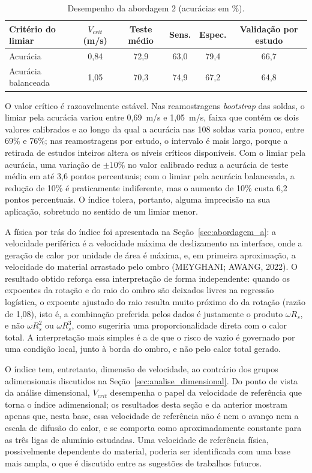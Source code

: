 \documentclass[12pt,openany]{report}
\begin{document}
\begin{table}[htbp]
\centering
\caption{Desempenho da abordagem 2 (acurácias em \%).}
\label{tab:res_abord2}
\small
\begin{tabular}{lccccc}
\toprule
\textbf{Critério do limiar} & \textbf{$V_{crit}$ (m/s)} & \textbf{Teste médio} & \textbf{Sens.} & \textbf{Espec.} & \textbf{Validação por estudo} \\ \midrule
Acurácia & 0,84 & 72,9 & 63,0 & 79,4 & 66,7 \\
Acurácia balanceada & 1,05 & 70,3 & 74,9 & 67,2 & 64,8 \\ \bottomrule
\end{tabular}
\end{table}

O valor crítico é razoavelmente estável. Nas reamostragens \textit{bootstrap} das soldas, o limiar pela acurácia variou entre 0,69~m/s e 1,05~m/s, faixa que contém os dois valores calibrados e ao longo da qual a acurácia nas 108 soldas varia pouco, entre 69\% e 76\%; nas reamostragens por estudo, o intervalo é mais largo, porque a retirada de estudos inteiros altera os níveis críticos disponíveis. Com o limiar pela acurácia, uma variação de $\pm10\%$ no valor calibrado reduz a acurácia de teste média em até 3,6 pontos percentuais; com o limiar pela acurácia balanceada, a redução de 10\% é praticamente indiferente, mas o aumento de 10\% custa 6,2 pontos percentuais. O índice tolera, portanto, alguma imprecisão na sua aplicação, sobretudo no sentido de um limiar menor.

A física por trás do índice foi apresentada na Seção~\ref{sec:abordagem_a}: a velocidade periférica é a velocidade máxima de deslizamento na interface, onde a geração de calor por unidade de área é máxima, e, em primeira aproximação, a velocidade do material arrastado pelo ombro (MEYGHANI; AWANG, 2022). O resultado obtido reforça essa interpretação de forma independente: quando os expoentes da rotação e do raio do ombro são deixados livres na regressão logística, o expoente ajustado do raio resulta muito próximo do da rotação (razão de 1,08), isto é, a combinação preferida pelos dados é justamente o produto $\omega R_s$, e não $\omega R_{s}^{2}$ ou $\omega R_{s}^{3}$, como sugeriria uma proporcionalidade direta com o calor total. A interpretação mais simples é a de que o risco de vazio é governado por uma condição local, junto à borda do ombro, e não pelo calor total gerado.

O índice tem, entretanto, dimensão de velocidade, ao contrário dos grupos adimensionais discutidos na Seção~\ref{sec:analise_dimensional}. Do ponto de vista da análise dimensional, $V_{crit}$ desempenha o papel da velocidade de referência que torna o índice adimensional; os resultados desta seção e da anterior mostram apenas que, nesta base, essa velocidade de referência não é nem o avanço nem a escala de difusão do calor, e se comporta como aproximadamente constante para as três ligas de alumínio estudadas. Uma velocidade de referência física, possivelmente dependente do material, poderia ser identificada com uma base mais ampla, o que é discutido entre as sugestões de trabalhos futuros.
\end{document}
